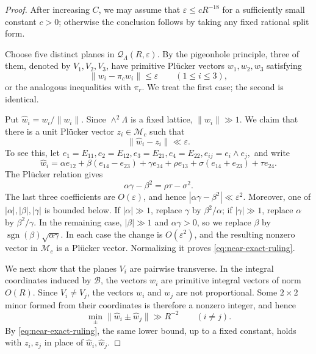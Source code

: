 \documentclass[reqno,11pt]{amsart}
\theoremstyle{definition}
\theoremstyle{remark}
\numberwithin{equation}{section}
\begin{document}
\begin{proof}
 After increasing $C$, we
may assume that
$
\varepsilon\le cR^{-18}
$
for a sufficiently small constant $c>0$; otherwise the conclusion follows
by taking any fixed rational split form.

Choose five distinct planes in $\mathcal Q_\Lambda(R,\varepsilon)$. By the
pigeonhole principle, three of them, denoted by $V_1,V_2,V_3$, have
primitive Pl\"ucker vectors $w_1,w_2,w_3$ satisfying
$$
\|w_i-\pi_cw_i\|\le\varepsilon
\qquad
(1\le i\le3),
$$
or the analogous inequalities with $\pi_r$. We treat the first case; the
second is identical.

Put $\widehat w_i=w_i/\|w_i\|$. Since $\wedge^2\Lambda$ is a fixed lattice,
$\|w_i\|\gg1$. We claim that there is a unit Pl\"ucker vector
$z_i\in\mathcal M_c$ such that
\begin{equation}\label{eq:near-exact-ruling}
\|\widehat w_i-z_i\|\ll\varepsilon.
\end{equation}
To see this, let
$
e_1=E_{11}, e_2=E_{12},
e_3=E_{21}, e_4=E_{22},
e_{ij}=e_i\wedge e_j,
$
and write
$$
\widehat w_i
=
\alpha e_{12}
+\beta(e_{14}-e_{23})
+\gamma e_{34}
+\rho e_{13}
+\sigma(e_{14}+e_{23})
+\tau e_{24}.
$$
The Pl\"ucker relation gives
$$
\alpha\gamma-\beta^2=\rho\tau-\sigma^2.
$$
The last three coefficients are $O(\varepsilon)$, and hence
$|\alpha\gamma-\beta^2|\ll\varepsilon^2$. Moreover, one of
$|\alpha|,|\beta|,|\gamma|$ is bounded below. If $|\alpha|\gg1$, replace
$\gamma$ by $\beta^2/\alpha$; if $|\gamma|\gg1$, replace $\alpha$ by
$\beta^2/\gamma$. In the remaining case, $|\beta|\gg1$ and
$\alpha\gamma>0$, so we replace $\beta$ by
$\operatorname{sgn}(\beta)\sqrt{\alpha\gamma}$. In each case the change is
$O(\varepsilon^2)$, and the resulting nonzero vector in $\mathcal M_c$ is
a Pl\"ucker vector. Normalizing it proves
\eqref{eq:near-exact-ruling}.

We next show that the planes $V_i$ are pairwise transverse. In the integral
coordinates induced by $\mathcal B$, the vectors $w_i$ are primitive
integral vectors of norm $O(R)$. Since $V_i\ne V_j$, the vectors $w_i$ and
$w_j$ are not proportional. Some $2\times2$ minor formed from their
coordinates is therefore a nonzero integer, and hence
\begin{equation}\label{eq:plucker-separation}
\min_{\pm}\|\widehat w_i\pm\widehat w_j\|
\gg R^{-2}
\qquad
(i\ne j).
\end{equation}
By \eqref{eq:near-exact-ruling}, the same lower bound, up to a fixed
constant, holds with $z_i,z_j$ in place of
$\widehat w_i,\widehat w_j$.


\end{proof}
\end{document}
